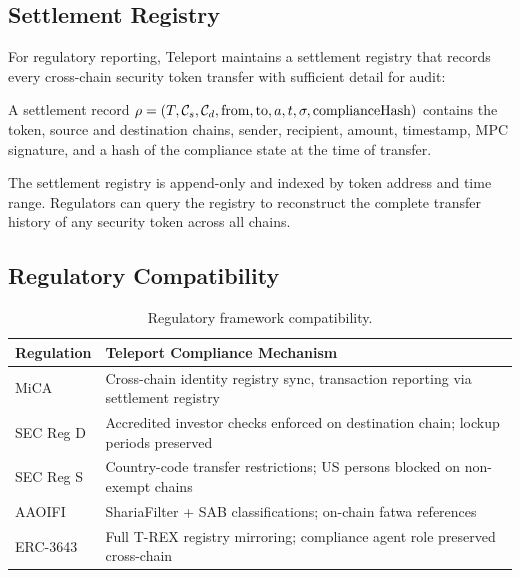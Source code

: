 \subsection{Settlement Registry}

For regulatory reporting, Teleport maintains a settlement registry that records every cross-chain security token transfer with sufficient detail for audit:

\begin{definition}
\label{def:settlement}
A settlement record $\rho = (T, \mathcal{C}_s, \mathcal{C}_d, \text{from}, \text{to}, a, t, \sigma, \text{complianceHash})$ contains the token, source and destination chains, sender, recipient, amount, timestamp, MPC signature, and a hash of the compliance state at the time of transfer.
\end{definition}

The settlement registry is append-only and indexed by token address and time range. Regulators can query the registry to reconstruct the complete transfer history of any security token across all chains.

\subsection{Regulatory Compatibility}

\begin{table}[h]
\centering
\small
\begin{tabular}{@{}p{2cm}p{4.8cm}@{}}
\toprule
\textbf{Regulation} & \textbf{Teleport Compliance Mechanism} \\
\midrule
MiCA~\cite{mica2023} & Cross-chain identity registry sync, transaction reporting via settlement registry \\
\addlinespace
SEC Reg D & Accredited investor checks enforced on destination chain; lockup periods preserved \\
\addlinespace
SEC Reg S & Country-code transfer restrictions; US persons blocked on non-exempt chains \\
\addlinespace
AAOIFI & ShariaFilter + SAB classifications; on-chain fatwa references \\
\addlinespace
ERC-3643 & Full T-REX registry mirroring; compliance agent role preserved cross-chain \\
\bottomrule
\end{tabular}
\caption{Regulatory framework compatibility.}
\label{tab:regulatory}
\end{table}

